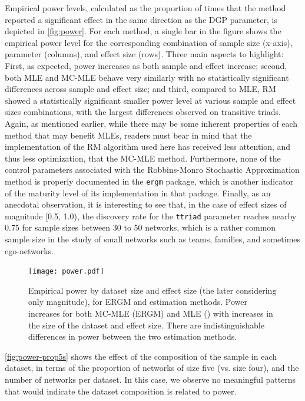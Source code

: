 \documentclass[review, nonatbib,doubleblind]{elsarticle/elsarticle}
\begin{document}
Empirical power levels, calculated as the proportion of times that the method reported a significant effect in the same direction as the DGP parameter, is depicted in \autoref{fig:power}. For each method, a single bar in the figure shows the empirical power level for the corresponding combination of sample size (x-axis), parameter (columns), and effect size (rows). Three main aspects to highlight: First, as expected, power increases as both sample and effect increase; second, both MLE and MC-MLE behave very similarly with no statistically significant differences across sample and effect size; and third, compared to MLE, RM showed a statistically significant smaller power level at various sample and effect sizes combinations, with the largest differences observed on transitive triads. Again, as mentioned earlier, while there may be some inherent properties of each method that may benefit MLEs, readers must bear in mind that the implementation of the RM algorithm used here has received less attention, and thus less optimization, that the MC-MLE method. Furthermore, none of the control parameters associated with the Robbins-Monro Stochastic Approximation method is properly documented in the \texttt{ergm} package, which is another indicator of the maturity level of its implementation in that package. Finally, as an anecdotal observation, it is interesting to see that, in the case of effect sizes of magnitude [0.5, 1.0), the discovery rate for the \texttt{ttriad} parameter reaches nearby 0.75 for sample sizes between 30 to 50 networks, which is a rather common sample size in the study of small networks such as teams, families, and sometimes ego-networks. 

\begin{figure}[tb]
	\centering
	\caption{\label{fig:power}Empirical power by dataset size and effect size (the later considering only magnitude), for ERGM and \ergmito{} estimation methods. Power increases for both MC-MLE (ERGM) and MLE (\ergmito{}) with increases in the size of the dataset and effect size. There are indistinguishable differences in power between the two estimation methods.}
	\texttt{[image: power.pdf]}
\end{figure}

\autoref{fig:power-prop5s} shows the effect of the composition of the sample in each dataset, in terms of the proportion of networks of size five (vs. size four), and the number of networks per dataset. In this case, we observe no meaningful patterns that would indicate the dataset composition is related to power.
\end{document}
